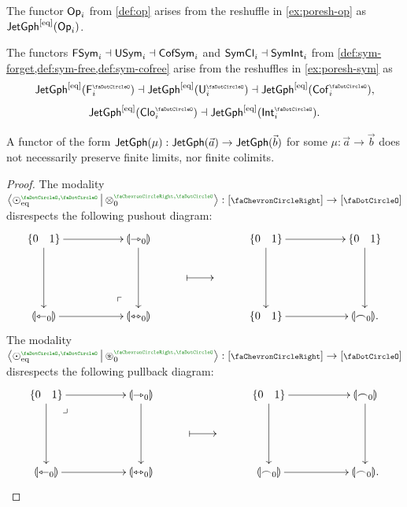 \documentclass[a4paper]{memoir}
\begin{document}
\begin{example} \label{ex:poresh-op-jetgph}
	The functor ${\mathsf{Op}}_i$ from \cref{def:op} arises from the reshuffle in \cref{ex:poresh-op} as $\mathsf{JetGph}^{[{\mathrm{eq}}]}({\mathsf{Op}}_i)$.
\end{example}
\begin{example} \label{ex:poresh-sym-jetgph}
	The functors $\mathsf{FSym}_i \dashv \mathsf{USym}_i \dashv \mathsf{CofSym}_i$ and $\mathsf{SymCl}_i \dashv \mathsf{SymInt}_i$ from \cref{def:sym-forget,def:sym-free,def:sym-cofree} arise from the reshuffles in \cref{ex:poresh-sym} as
	\[
		\jetgphl{\Fsymresh_i} \dashv \jetgphl{\Usymresh_i} \dashv \jetgphl{\Csymresh_i},
	\]
	\[
		\jetgphl{\UFsymresh_i} \dashv \jetgphl{\UCsymresh_i}.
	\]
\end{example}
\begin{proposition} \label{thm:poresh-jetgph-nonexact}
	A functor of the form $\mathsf{JetGph}(\mu) : \mathsf{JetGph}(\vec a) \to \mathsf{JetGph}(\vec b)$ for some $\mu : \vec a \to \vec b$ does not necessarily preserve finite limits, nor finite colimits.	
\end{proposition}
\begin{proof}
	The modality $\reshlist{\nonpol_\eqtydeg\pmrnn}{\mixpol_0\pmryn} : [\ypolar] \to [\npolar]$ disrespects the following pushout diagram:
	\[
		\xymatrix{
			\accol{0 \quad 1}
				\ar[rr]
				\ar[dd]
				\ar@{}[rrdd]|(.8){\mbox{$\ulcorner$}}
			&& \rival{\jetsym_0}
				\ar[dd]
			&&& %
			\accol{0 \quad 1}
				\ar[rr]
				\ar[dd]
			&& \accol{0 \quad 1}
				\ar[dd]
			\\ %
			&&& {} \ar@{|->}[r]
			& {}
			\\ %
			\rival{\tejsym_0}
				\ar[rr]
			&& \rival{\equijetsym_0}
			&&& %
			\accol{0 \quad 1}
				\ar[rr]
			&& \rival{\edgesym_0}.
		}
	\]
	The modality $\reshlist{\nonpol_\eqtydeg\pmrnn}{\isopol_0\pmryn} : [\ypolar] \to [\npolar]$ disrespects the following pullback diagram:
	\[
		\xymatrix{
			\accol{0 \quad 1}
				\ar[rr]
				\ar[dd]
				\ar@{}[rrdd]|(.2){\mbox{$\lrcorner$}}
			&& \rival{\jetsym_0}
				\ar[dd]
			&&& %
			\accol{0 \quad 1}
				\ar[rr]
				\ar[dd]
			&& \rival{\edgesym_0}
				\ar[dd]
			\\ %
			&&& {} \ar@{|->}[r]
			& {}
			\\ %
			\rival{\tejsym_0}
				\ar[rr]
			&& \rival{\equijetsym_0}
			&&& %
			\rival{\edgesym_0}
				\ar[rr]
			&& \rival{\edgesym_0}.
		}
	\]
\end{proof}
\end{document}
